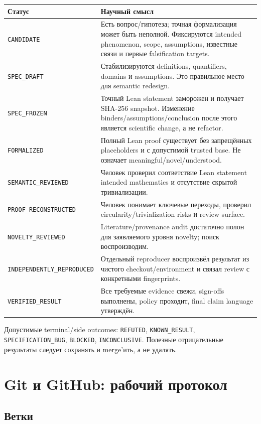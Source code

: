 \documentclass[11pt,a4paper]{article}
\newcommand{\status}[1]{\texttt{#1}}
\begin{document}
\begin{longtable}{@{}p{}p{}@{}}
\toprule
\textbf{Статус} & \textbf{Научный смысл} \\
\midrule
\endhead
\status{CANDIDATE} & Есть вопрос/гипотеза; точная формализация может быть неполной. Фиксируются intended phenomenon, scope, assumptions, известные связи и первые falsification targets. \\
\status{SPEC\_DRAFT} & Стабилизируются definitions, quantifiers, domains и assumptions. Это правильное место для semantic redesign. \\
\status{SPEC\_FROZEN} & Точный Lean statement заморожен и получает SHA-256 snapshot. Изменение binders/assumptions/conclusion после этого является scientific change, а не refactor. \\
\status{FORMALIZED} & Полный Lean proof существует без запрещённых placeholders и с допустимой trusted base. Не означает meaningful/novel/understood. \\
\status{SEMANTIC\_REVIEWED} & Человек проверил соответствие Lean statement intended mathematics и отсутствие скрытой тривиализации. \\
\status{PROOF\_RECONSTRUCTED} & Человек понимает ключевые переходы, проверил circularity/trivialization risks и review surface. \\
\status{NOVELTY\_REVIEWED} & Literature/provenance audit достаточно полон для заявляемого уровня novelty; поиск воспроизводим. \\
\status{INDEPENDENTLY\_REPRODUCED} & Отдельный reproducer воспроизвёл результат из чистого checkout/environment и связал review с конкретными fingerprints. \\
\status{VERIFIED\_RESULT} & Все требуемые evidence свежи, sign-offs выполнены, policy проходит, final claim language утверждён. \\
\bottomrule
\end{longtable}

Допустимые terminal/side outcomes: \status{REFUTED}, \status{KNOWN\_RESULT}, \status{SPECIFICATION\_BUG}, \status{BLOCKED}, \status{INCONCLUSIVE}. Полезные отрицательные результаты следует сохранять и merge'ить, а не удалять.

\section{Git и GitHub: рабочий протокол}

\subsection{Ветки}
\end{document}
